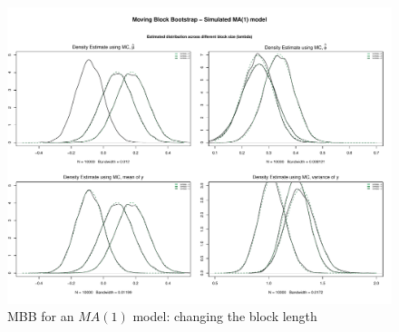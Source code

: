 \documentclass{article}
\begin{document}
\begin{figure}[hbt!]
\includegraphics[width=\textwidth]{plots/MBB_MA1_densities_diff_blocklength}
\caption{MBB for an $MA(1)$ model: changing the block length}
\label{fig:MBB_MA1_densities_diff_blocklength}
\centering
\end{figure}
\end{document}

